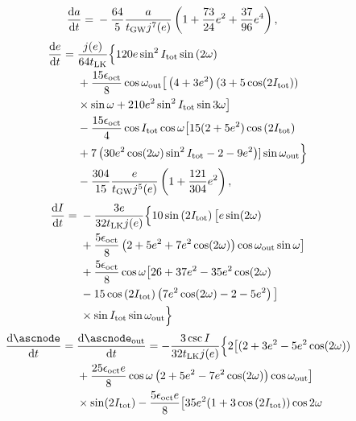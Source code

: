\documentclass[11pt,
        usenames, %
        dvipsnames %
    ]{article}
\newcommand*{\rd}[2]{\frac{\mathrm{d}#1}{\mathrm{d}#2}}
\newcommand*{\p}[1]{\left(#1\right)}
\begin{document}
{\small
\begin{align}
    \rd{a}{t} ={}& -\frac{64}{5}\frac{a}{t_{\rm GW}j^7(e)}
            \p{1 + \frac{73}{24}e^2 +
            \frac{37}{96}e^4},
\end{align}
\begin{align}
    \rd{e}{t} ={}& \frac{j(e)}{64t_{\rm LK}}\Big\{
            120 e \sin^2 I_{\rm tot} \sin \p{2\omega}\nonumber\\
        &+ \frac{15 \epsilon_{\rm oct}}{8}\cos \omega_{\rm out}
            \big[\p{4 + 3e^2}\p{3 + 5\cos (2I_{\rm tot})}\nonumber\\
        &\times \sin \omega + 210 e^2\sin^2I_{\rm tot} \sin 3\omega\big]
            \nonumber\\
        &- \frac{15 \epsilon_{\rm oct}}{4} \cos I_{\rm tot} \cos \omega
            \big[15(2 + 5e^2) \cos \p{2I_{\rm tot}}\nonumber\\
        &+ 7\p{30 e^2 \cos(2\omega) \sin^2 I_{\rm tot} - 2 - 9e^2}]
                \sin \omega_{\rm out}\Big\}\nonumber\\
        &- \frac{304}{15}\frac{e}{t_{\rm GW}j^5(e)}
            \p{1 + \frac{121}{304}e^2},
\end{align}
\begin{align}
    \rd{I}{t} ={}& -\frac{3e}{32t_{\rm LK}j(e)}\Big\{
            10\sin\p{2I_{\rm tot}}\big[e \sin (2\omega)\nonumber\\
        &+ \frac{5\epsilon_{\rm oct}}{8}\p{2 + 5e^2 + 7e^2\cos(2\omega)}
            \cos \omega_{\rm out}\sin \omega\big]\nonumber\\
        &+ \frac{5\epsilon_{\rm oct}}{8} \cos \omega \big[
            26 + 37e^2 -35 e^2\cos(2\omega)\nonumber\\
        &- 15\cos\p{2I_{\rm tot}}\p{7e^2\cos (2\omega) - 2 - 5e^2}\big]\nonumber\\
        &\times \sin I_{\rm tot}\sin \omega_{\rm out}\Big\}
\end{align}
\begin{align}
    \rd{\ascnode}{t} ={}& \rd{\ascnode_{\rm out}}{t}
            = -\frac{3\csc I}{32 t_{\rm LK}j(e)}\Big\{
            2\big[(2 + 3e^2 - 5e^2 \cos (2\omega))\nonumber\\
        &+ \frac{25 \epsilon_{\rm oct}e}{8} \cos \omega
            \p{2 + 5e^2 - 7e^2\cos(2\omega)}\cos \omega_{\rm out}\big]\nonumber\\
        &\times\sin (2I_{\rm tot}) - \frac{5\epsilon_{\rm oct}e}{8}
            \big[35e^2(1 + 3\cos\p{2I_{\rm tot}})\cos 2\omega\nonumber\\

\end{align}}
\end{document}
